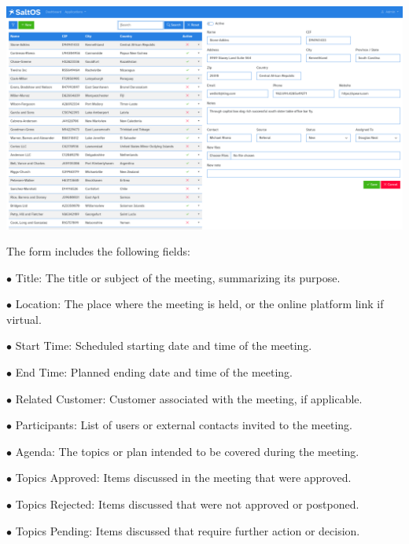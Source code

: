 \documentclass[a4paper]{article}
\begin{document}
\begin{center}\includegraphics[width=1\textwidth]{../ujest/snaps/test-screenshots-js-screenshots-crm-leads-edit-100-en-us-1-snap.png}\end{center}

The form includes the following fields:

\begin{compactitem}
\item[\color{myblue}$\bullet$] Title: The title or subject of the meeting, summarizing its purpose.
\item[\color{myblue}$\bullet$] Location: The place where the meeting is held, or the online platform link if virtual.
\item[\color{myblue}$\bullet$] Start Time: Scheduled starting date and time of the meeting.
\item[\color{myblue}$\bullet$] End Time: Planned ending date and time of the meeting.
\item[\color{myblue}$\bullet$] Related Customer: Customer associated with the meeting, if applicable.
\item[\color{myblue}$\bullet$] Participants: List of users or external contacts invited to the meeting.
\item[\color{myblue}$\bullet$] Agenda: The topics or plan intended to be covered during the meeting.
\item[\color{myblue}$\bullet$] Topics Approved: Items discussed in the meeting that were approved.
\item[\color{myblue}$\bullet$] Topics Rejected: Items discussed that were not approved or postponed.
\item[\color{myblue}$\bullet$] Topics Pending: Items discussed that require further action or decision.
\end{compactitem}
\end{document}
